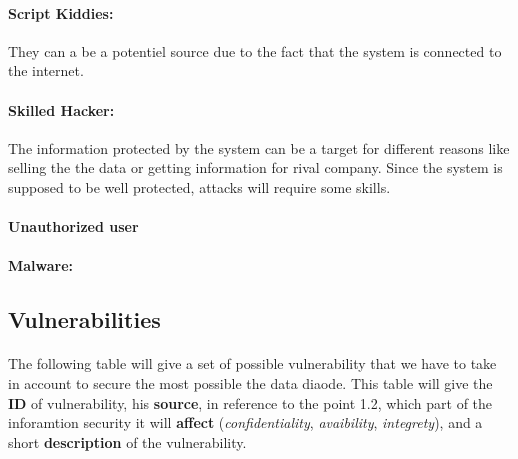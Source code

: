 \documentclass[a4paper,10pt]{article}
\begin{document}
\paragraph{Script Kiddies:} They can a be a potentiel source due to the fact that the system is connected to the internet.

\paragraph{Skilled Hacker:} The information protected by the system can be a target for different reasons like selling the the data or getting information for rival company. Since the system is supposed to be well protected, attacks will require some skills.

\paragraph{Unauthorized user}

\paragraph{Malware:} 

\subsection{Vulnerabilities}

\paragraph{} The following table will give a set of possible vulnerability that we have to take in account to secure the most possible the data diaode. This table will give the \textbf{ID} of vulnerability, his \textbf{source}, in reference to the point 1.2, which part of the inforamtion security it will \textbf{affect} (\textit{confidentiality}, \textit{avaibility}, \textit{integrety}), and a short \textbf{description} of the vulnerability.
\end{document}
